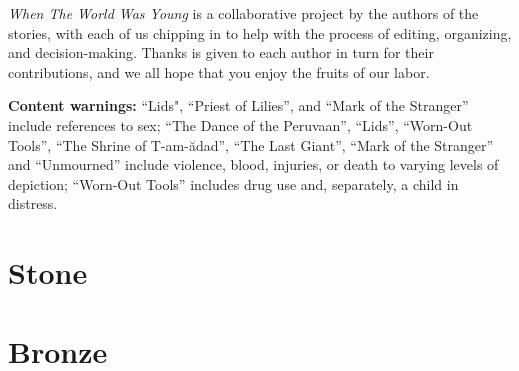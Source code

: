 \documentclass[11pt]{memoir}
\begin{document}
  \newpage

  

  \newpage
  \null
  \cleardoublepage
  \tableofcontents*
  \newpage
  \null
  \cleardoublepage

  \null
  \vfill
  
  \noindent\emph{When The World Was Young} is a collaborative project by the authors of the stories, with each of us chipping in to help with the process of editing, organizing, and decision-making. Thanks is given to each author in turn for their contributions, and we all hope that you enjoy the fruits of our labor.

  \vfill

  \textbf{Content warnings:} ``Lids", ``Priest of Lilies'', and ``Mark of the Stranger'' include references to sex; ``The Dance of the Peruvaan'', ``Lids'', ``Worn-Out Tools'', ``The Shrine of T-am-ădad'', ``The Last Giant'', ``Mark of the Stranger'' and ``Unmourned'' include violence, blood, injuries, or death to varying levels of depiction; ``Worn-Out Tools'' includes drug use and, separately, a child in distress.

  \mainmatter

  \pagestyle{ourbook}

  \part*{Stone}
  \thispagestyle{empty}
	
  
  
	
  
  
  
  
  
	
  
  
  
	
	

  
  

  \part*{Bronze}
  \thispagestyle{empty}
  
\end{document}
